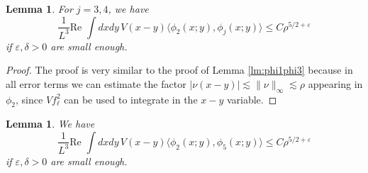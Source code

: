 \documentclass[a4paper,11pt]{article}
\def\eps{\varepsilon}
\newtheorem{lemma}[theorem]{Lemma}
\numberwithin{equation}{section}
\begin{document}
\begin{lemma} For $j=3,4$, we have 
\[ \frac{1}{L^3} \text{Re } \int dx dy \, V(x-y) \langle \phi_2 (x;y) , \phi_j (x;y) \rangle \leq C \rho^{5/2+\eps} \]
if $\eps ,\delta > 0$ are small enough. 
\end{lemma} 
\begin{proof}
The proof is very similar to the proof of Lemma \ref{lm:phi1phi3} because in all error terms we can estimate the factor $|\nu (x-y)| \lesssim \| \nu \|_\infty \lesssim \rho$ appearing in $\phi_2$, since $Vf_\ell^2$ can be used to integrate in the $x-y$ variable.  
\end{proof} 

\begin{lemma} We have 
\[ \frac{1}{L^3} \text{Re } \int dx dy \, V(x-y) \langle \phi_2 (x;y) , \phi_5 (x;y) \rangle \leq C \rho^{5/2+\eps}  \]
if $\eps, \delta > 0$ are small enough. 
\end{lemma} 
\end{document}
